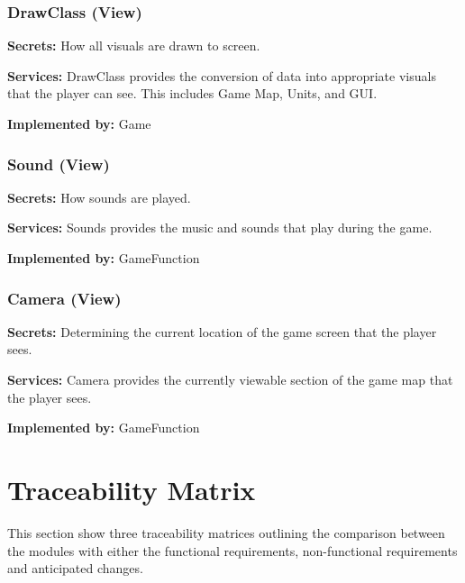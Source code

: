 \documentclass{article}
\begin{document}
\subsubsection{DrawClass (View)}
\begin{description}[leftmargin=0.2cm]
    \item \textbf{Secrets:} How all visuals are drawn to screen.
    \item \textbf{Services:} DrawClass provides the conversion of data into appropriate visuals that the player can see. This includes Game Map, Units, and GUI.
    \item \textbf{Implemented by:} Game
\end{description}

\subsubsection{Sound (View)}
\begin{description}[leftmargin=0.2cm]
    \item \textbf{Secrets:} How sounds are played.
    \item \textbf{Services:} Sounds provides the music and sounds that play during the game.
    \item \textbf{Implemented by:} GameFunction
\end{description}

\subsubsection{Camera (View)}
\begin{description}[leftmargin=0.2cm]
    \item \textbf{Secrets:} Determining the current location of the game screen that the player sees.
    \item \textbf{Services:} Camera provides the currently viewable section of the game map that the player sees.
    \item \textbf{Implemented by:} GameFunction
\end{description}


\section{Traceability Matrix} \label{SecTM}

This section show three traceability matrices outlining the comparison between the modules with either the functional requirements, non-functional requirements and anticipated changes.
\end{document}
